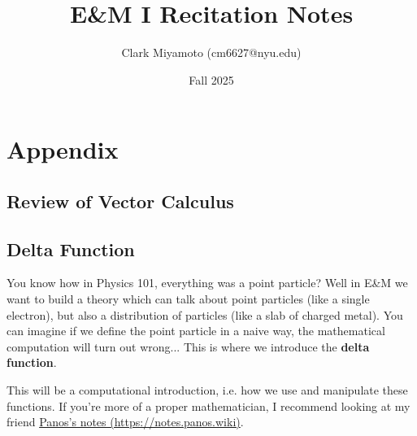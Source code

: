 \documentclass[12pt,fleqn]{article}
\title{E\&M I Recitation Notes}
\author{Clark Miyamoto (cm6627@nyu.edu)}
\date{Fall 2025}
\numberwithin{equation}{section} %
\begin{document}
\maketitle

\tableofcontents

\section{Appendix}

\subsection{Review of Vector Calculus}

\subsection{Delta Function}
You know how in Physics 101, everything was a point particle? Well in E\&M we want to build a theory which can talk about point particles (like a single electron), but also a distribution of particles (like a slab of charged metal). You can imagine if we define the point particle in a naive way, the mathematical computation will turn out wrong... This is where we introduce the \textbf{delta function}.
\begin{sidework}
	This will be a computational introduction, i.e. how we use and manipulate these functions. If you're more of a proper mathematician, I recommend looking at my friend \href{https://notes.panos.wiki/Analysis+Distributions}{Panos's notes (https://notes.panos.wiki)}.
\end{sidework}
\end{document}
